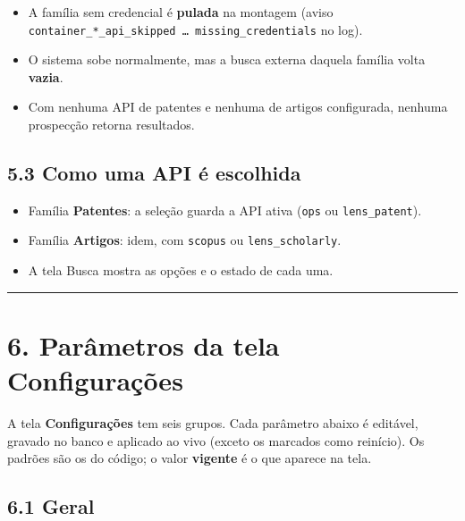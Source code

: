 \documentclass[
  brazilian,
  a4paper,12pt,oneside]{report}
\providecommand{\tightlist}{%
  \setlength{\itemsep}{0pt}\setlength{\parskip}{0pt}}
\begin{document}
\begin{itemize}
\tightlist
\item
  A família sem credencial é \textbf{pulada} na montagem (aviso
  \texttt{container\_}\allowbreak{}\texttt{*\_}\allowbreak{}\texttt{api\_}\allowbreak{}\texttt{skipped\ …\ missing\_}\allowbreak{}\texttt{credentials}
  no log).
\item
  O sistema sobe normalmente, mas a busca externa daquela família volta
  \textbf{vazia}.
\item
  Com nenhuma API de patentes e nenhuma de artigos configurada, nenhuma
  prospecção retorna resultados.
\end{itemize}

\section{5.3 Como uma API é
escolhida}\label{como-uma-api-uxe9-escolhida}

\begin{itemize}
\tightlist
\item
  Família \textbf{Patentes}: a seleção guarda a API ativa (\texttt{ops}
  ou \texttt{lens\_}\allowbreak{}\texttt{patent}).
\item
  Família \textbf{Artigos}: idem, com \texttt{scopus} ou
  \texttt{lens\_}\allowbreak{}\texttt{scholarly}.
\item
  A tela Busca mostra as opções e o estado de cada uma.
\end{itemize}

\begin{center}\rule{0.5\linewidth}{0.5pt}\end{center}

\chapter{6. Parâmetros da tela
Configurações}\label{paruxe2metros-da-tela-configurauxe7uxf5es}

A tela \textbf{Configurações} tem seis grupos. Cada parâmetro abaixo é
editável, gravado no banco e aplicado ao vivo (exceto os marcados como
reinício). Os padrões são os do código; o valor \textbf{vigente} é o que
aparece na tela.

\section{6.1 Geral}\label{geral}
\end{document}
